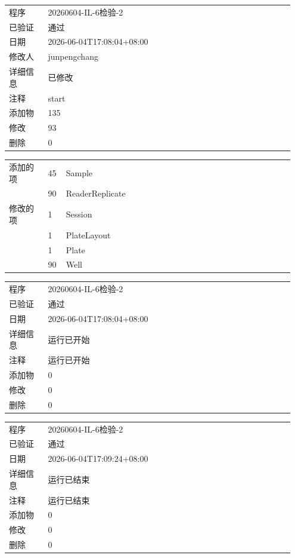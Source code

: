\documentclass[UTF8,10pt,a4paper,fontset=fandol]{ctexart}
\begin{document}
\begin{flushleft}
\vspace{0.7em}

\begin{tabular}{@{}p{0.13\linewidth}p{0.82\linewidth}@{}}
程序 & 20260604-IL-6检验-2\\
已验证 & 通过\\
日期 & 2026-06-04T17:08:04+08:00\\
修改人 & junpengchang\\
详细信息 & 已修改\\
注释 & start\\[0.3em]
添加物 & 135\\
修改 & 93\\
删除 & 0\\
\end{tabular}

\vspace{0.3em}

\begin{tabular}{@{}p{0.13\linewidth}p{0.06\linewidth}p{0.76\linewidth}@{}}
添加的项 & 45 & Sample\\
& 90 & ReaderReplicate\\[0.2em]
修改的项 & 1 & Session\\
& 1 & PlateLayout\\
& 1 & Plate\\
& 90 & Well\\
\end{tabular}

\vspace{0.7em}

\begin{tabular}{@{}p{0.13\linewidth}p{0.82\linewidth}@{}}
程序 & 20260604-IL-6检验-2\\
已验证 & 通过\\
日期 & 2026-06-04T17:08:04+08:00\\
详细信息 & 运行已开始\\
注释 & 运行已开始\\[0.3em]
添加物 & 0\\
修改 & 0\\
删除 & 0\\
\end{tabular}

\vspace{0.7em}

\begin{tabular}{@{}p{0.13\linewidth}p{0.82\linewidth}@{}}
程序 & 20260604-IL-6检验-2\\
已验证 & 通过\\
日期 & 2026-06-04T17:09:24+08:00\\
详细信息 & 运行已结束\\
注释 & 运行已结束\\[0.3em]
添加物 & 0\\
修改 & 0\\
删除 & 0\\
\end{tabular}


\end{flushleft}
\end{document}
